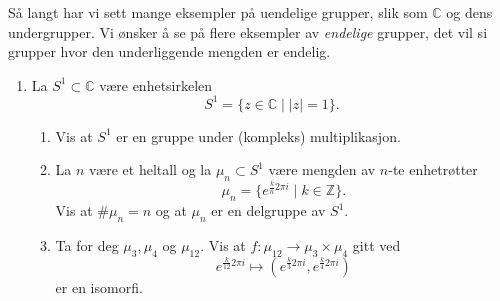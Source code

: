 Så langt har vi sett mange eksempler på uendelige grupper,
slik som $\mathbb C$ og dens undergrupper.
Vi ønsker å se på flere eksempler av \textit{endelige} grupper,
det vil si grupper hvor den underliggende mengden er endelig.
\begin{enumerate}[resume]
    \item La $S^1\subset \mathbb C$ være enhetsirkelen
        \[
            S^1 = \{ z\in \mathbb C\mid |z| = 1\}.
        \]
        \begin{enumerate}
            \item Vis at $S^1$ er en gruppe under (kompleks) multiplikasjon.
            \item La $n$ være et heltall og la $\mu_n\subset S^1$ være mengden av $n$-te
                enhetrøtter
                \[
                    \mu_n = \{
                        e^{\frac k n 2\pi i}
                        \mid k\in \mathbb Z
                    \}.
                \]
                Vis at $\# \mu_n = n$ og at $\mu_n$ er en delgruppe av $S^1$.
            \item Ta for deg $\mu_3, \mu_4$ og $\mu_{12}$.
                Vis at $f\colon \mu_{12}\to \mu_3\times \mu_4$
                gitt ved
                \[
                    e^{\frac k {12} 2\pi i}
                    \mapsto (e^{\frac k 3 2\pi i}, e^{\frac k 4 2\pi i})
                \]
                er en isomorfi.


\end{enumerate}
\end{enumerate}
